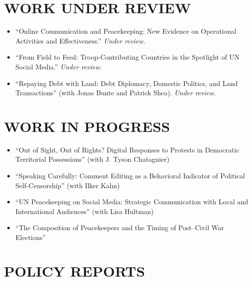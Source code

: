 \documentclass[11pt,a4paper,roman]{moderncv}
\begin{document}
	\section{WORK UNDER REVIEW}
	
	\begin{itemize}
		\item ``Online Communication and Peacekeeping: New Evidence on Operational Activities and Effectiveness.'' \textit{Under review.}
		\item ``From Field to Feed: Troop-Contributing Countries in the Spotlight of UN Social Media.'' \textit{Under review.}
		\item ``Repaying Debt with Land: Debt Diplomacy, Domestic Politics, and Land Transactions'' (with Jonas Bunte and Patrick Shea). \textit{Under review.}
	\end{itemize}
	
	\section{WORK IN PROGRESS}
	
	\begin{itemize}
		\item ``Out of Sight, Out of Rights? Digital Responses to Protests in Democratic Territorial Possessions'' (with J. Tyson Chatagnier)
		\item ``Speaking Carefully: Comment Editing as a Behavioral Indicator of Political Self-Censorship'' (with Ilker Kal{\i}n)
		\item ``UN Peacekeeping on Social Media: Strategic Communication with Local and International Audiences'' (with Lisa Hultman)
		\item ``The Composition of Peacekeepers and the Timing of Post--Civil War Elections''
	\end{itemize}
	
	\section{POLICY REPORTS}
	
\end{document}
